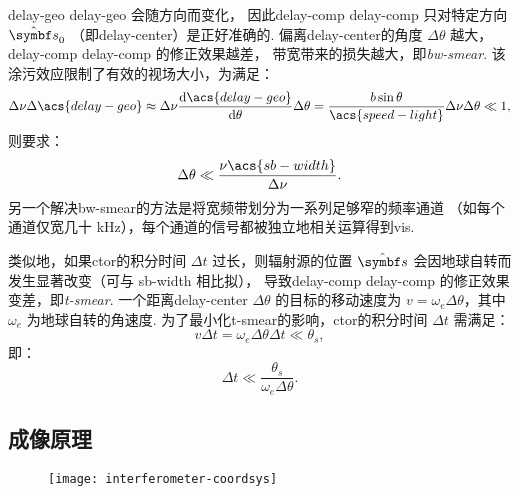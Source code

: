 \acl{delay-geo} \acs{delay-geo} 会随方向而变化，
因此\acl{delay-comp} \acs{delay-comp} 只对特定方向 $\hat{\B{s}}_0$
（即\ac{delay-center}）是正好准确的.
偏离\ac{delay-center}的角度 $\Delta\theta$ 越大，
\acl{delay-comp} \acs{delay-comp} 的修正效果越差，
带宽带来的损失越大，即\emph{\acf{bw-smear}}.
该涂污效应限制了有效的视场大小，为满足：
\begin{equation}
  \Delta\nu \Delta\acs{delay-geo}
    \approx \Delta\nu \diff{\acs{delay-geo}}{\theta} \Delta\theta
    = \frac{b \sin\theta}{\acs{speed-light}} \Delta\nu \Delta\theta
    \ll 1,
\end{equation}
则要求：
\begin{equation}
  \Delta\theta \ll \frac{\nu \acs{sb-width}}{\Delta\nu}.
\end{equation}
另一个解决\ac{bw-smear}的方法是将宽频带划分为一系列足够窄的频率通道
（如每个通道仅宽几十 \si{\kHz}），每个通道的信号都被独立地相关运算得到\ac{vis}.

类似地，如果\ac{ctor}的积分时间 $\Delta t$ 过长，则辐射源的位置 $\hat{\B{s}}$
会因地球自转而发生显著改变（可与 \acs{sb-width} 相比拟），
导致\acl{delay-comp} \acs{delay-comp} 的修正效果变差，即\emph{\acf{t-smear}}.
一个距离\acl{delay-center} $\Delta\theta$ 的目标的移动速度为
$v = \omega_e \Delta\theta$，其中 $\omega_e$ 为地球自转的角速度.
为了最小化\ac{t-smear}的影响，\ac{ctor}的积分时间 $\Delta t$ 需满足：
\begin{equation}
  v \Delta t = \omega_e \Delta\theta \Delta t \ll \theta_s,
\end{equation}
即：
\begin{equation}
  \label{eq:ctor-avgtime}
  \Delta t \ll \frac{\theta_s}{\omega_e \Delta\theta}.
\end{equation}

\subsection{成像原理}

\begin{figure}[htp]
  \centering
  \texttt{[image: interferometer-coordsys]}
  \label{fig:interferometer-coordsys}
\end{figure}

